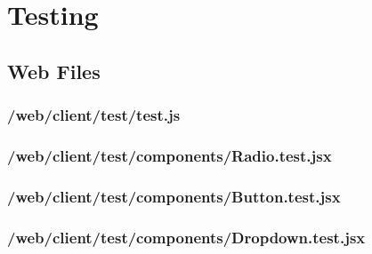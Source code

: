\section{Testing}
\label{app:test}



\subsection{Web Files}
\label{app:test_web_files}

\subsubsection{/web/client/test/test.js}
\label{app:web_test_js}


\subsubsection{/web/client/test/components/Radio.test.jsx}
\label{app:web_Radio_test_jsx}


\subsubsection{/web/client/test/components/Button.test.jsx}
\label{app:web_Button_test_jsx}


\subsubsection{/web/client/test/components/Dropdown.test.jsx}
\label{app:web_Dropdown_test_jsx}

